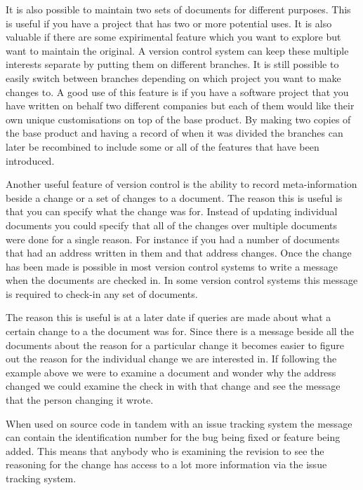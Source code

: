 It is also possible to maintain two sets of documents for different purposes. This is useful if you have a project that has two or more potential uses. It is also valuable if there are some expirimental feature which you want to explore but want to maintain the original. A version control system can keep these multiple interests separate by putting them on different branches.  It is still possible to easily switch between branches depending on which project you want to make changes to.  A good use of this feature is if you have a software project that you have written on behalf two different companies but each of them would like their own unique customisations on top of the base product.  By making two copies of the base product and having a record of when it was divided the branches can later be recombined to include some or all of the features that have been introduced. 

Another useful feature of version control is the ability to record meta-information beside a change or a set of changes to a document.  The reason this is useful is that you can specify what the change was for.  Instead of updating individual documents you could specify that all of the changes over multiple documents were done for a single reason.  For instance if you had a number of documents that had an address written in them and that address changes.  Once the change has been made is possible in most version control systems to write a message when the documents are checked in.  In some version control systems this message is required to check-in any set of documents.

The reason this is useful is at a later date if queries are made about what a certain change to a the document was for.  Since there is a message beside all the documents about the reason for a particular change it becomes easier to figure out the reason for the individual change we are interested in. If following the example above we were to examine a document and wonder why the address changed we could examine the check in with that change and see the message that the person changing it wrote.

When used on source code in tandem with an issue tracking system the message can contain the identification number for the bug being fixed or feature being added.  This means that anybody who is examining the revision to see the reasoning for the change has access to a lot more information via the issue tracking system.  

